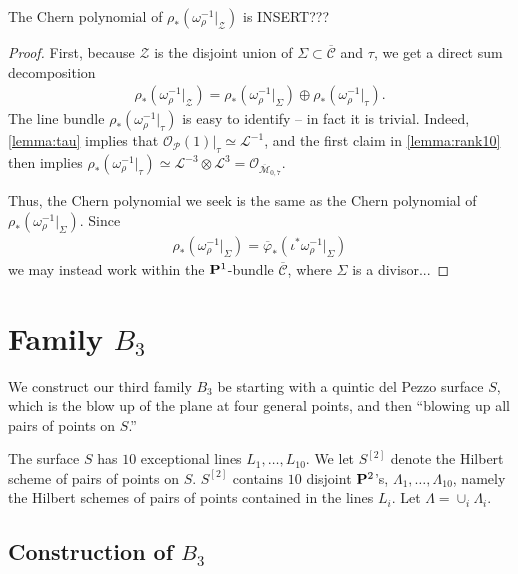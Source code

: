 \documentclass[12pt,reqno]{amsart}
\DeclareMathOperator{\M}{\mathcal{M}}
\numberwithin{equation}{section}
\renewcommand{\O}{\mathcal O}
\newcommand{\cP}{\mathcal P}
\newcommand{\cC}{\mathcal{C}}
\renewcommand {\o}[1]{\overline{#1}}
\begin{document}
\begin{proposition}
  \label{prop:omegarestrictZ} The Chern polynomial of $\rho_{*}(\omega_{\rho}^{-1}|_{\mathcal{Z}})$ is INSERT???
\end{proposition}

\begin{proof}
  First, because $\mathcal{Z}$ is the disjoint union of
  $\Sigma \subset \o{\mathcal{C}}$ and $\tau$, we get a direct sum
  decomposition
  \begin{align}
    \label{eq:dirsum}
    \rho_{*}(\omega_{\rho}^{-1}|_{\mathcal{Z}}) = \rho_{*}(\omega_{\rho}^{-1}|_{\Sigma}) \oplus \rho_{*}(\omega_{\rho}^{-1}|_{\tau}).
  \end{align}
  The line bundle $\rho_{*}(\omega_{\rho}^{-1}|_{\tau})$ is easy to
  identify -- in fact it is trivial.  Indeed, \autoref{lemma:tau}
  implies that $\O_{\cP}(1)|_{\tau} \simeq \mathcal{L}^{-1}$, and the
  first claim in \autoref{lemma:rank10} then implies
  $\rho_{*}(\omega_{\rho}^{-1}|_{\tau}) \simeq \mathcal{L}^{-3}
  \otimes \mathcal{L}^{3} = \O_{\o{\M}_{0,7}}$.

  Thus, the Chern polynomial we seek is the same as the Chern
  polynomial of $\rho_{*}(\omega_{\rho}^{-1}|_{\Sigma})$.  Since
  \begin{align*}
    \rho_{*}(\omega_{\rho}^{-1}|_{\Sigma}) = \o{\varphi}_{*}(\iota^{*}\omega_{\rho}^{-1}|_{\Sigma})
  \end{align*}
  we may instead work within the $\P^{1}$-bundle $\o{\cC}$, where
  $\Sigma$ is a divisor...
\end{proof}


\section{Family $B_3$}
\label{sec:family-b_3}

We construct our third family $B_3$ be starting with a quintic del
Pezzo surface $S$, which is the blow up of the plane at four general
points, and then ``blowing up all pairs of points on $S$.''

The surface $S$ has $10$ exceptional lines $L_{1}, \dots, L_{10}$.  We
let $S^{[2]}$ denote the Hilbert scheme of pairs of points on $S$.
$S^{[2]}$ contains $10$ disjoint $\P^{2}$'s,
$\Lambda_1, \dots, \Lambda_{10}$, namely the Hilbert schemes of pairs
of points contained in the lines $L_{i}$. Let
$\Lambda = \cup_{i}\Lambda_{i}$.

\subsection{Construction of $B_3$}
\label{sec:construction-b_3}
\end{document}

